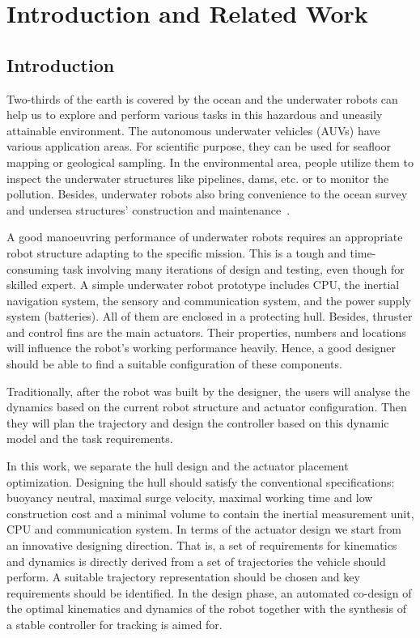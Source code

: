 \chapter{Introduction and Related Work}
\section{Introduction}
Two-thirds of the earth is covered by the ocean and the underwater robots can help us to explore and perform various tasks in this hazardous and uneasily attainable environment. The autonomous underwater vehicles (AUVs) have various application areas. For scientific purpose, they can be used for seafloor mapping or geological sampling. In the environmental area, people utilize them to inspect the underwater structures like pipelines, dams, etc. or to monitor the pollution. Besides, underwater robots also bring convenience to the ocean survey and undersea structures' construction and maintenance~\cite{Yuh2000}. 

A good manoeuvring performance of underwater robots requires an appropriate robot structure adapting to the specific mission. This is a tough and time-consuming task involving many iterations of design and testing, even though for skilled expert. A simple underwater robot prototype includes CPU, the inertial navigation system, the sensory and communication system, and the power supply system (batteries). All of them are enclosed in a protecting hull. Besides, thruster and control fins are the main actuators. Their properties, numbers and locations will influence the robot's working performance heavily. Hence, a good designer should be able to find a suitable configuration of these components.

Traditionally, after the robot was built by the designer, the users will analyse the dynamics based on the current robot structure and actuator configuration. Then they will plan the trajectory and design the controller based on this dynamic model and the task requirements. 

In this work, we separate the hull design and the actuator placement optimization. Designing the hull should satisfy the conventional specifications: buoyancy neutral, maximal surge velocity, maximal working time and low construction cost and a minimal volume to contain the inertial measurement unit, CPU and communication system. In terms of the actuator design we start from an innovative designing direction. That is, a set of requirements for kinematics and dynamics is directly derived from a set of trajectories the vehicle should perform. A suitable trajectory representation should be chosen and key requirements should be identified. In the design phase, an automated co-design of the optimal kinematics and dynamics of the robot together with the synthesis of a stable controller for tracking is aimed for. 

